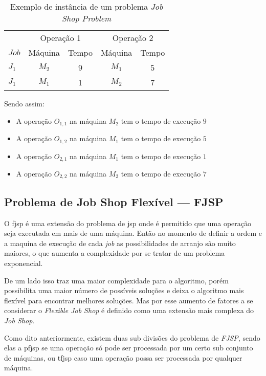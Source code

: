 \begin{table}[htb]
    \centering
    \caption{Exemplo de instância de um problema \textit{Job Shop Problem}}
    \label{fig:ex-instancia-problema-JSP}
    \begin{tabular}[t]{lcccc}
        \hline
        &\multicolumn{2}{c}{Operação 1}&\multicolumn{2}{c}{Operação 2}\\
        $Job$&Máquina&Tempo&Máquina&Tempo\\
        \hline
        $J_1$&$M_2$&9&$M_1$&5\\
        $J_1$&$M_1$&1&$M_2$&7\\
        \hline
    \end{tabular}
\end{table}

\noindent Sendo assim:\hfill
\begin{itemize}
    \item A operação $O_{1,1}$ na máquina $M_2$ tem o tempo de execução $9$
    \item A operação $O_{1,2}$ na máquina $M_1$ tem o tempo de execução $5$
    \item A operação $O_{2,1}$ na máquina $M_1$ tem o tempo de execução $1$
    \item A operação $O_{2,2}$ na máquina $M_2$ tem o tempo de execução $7$
\end{itemize}


\subsection{Problema de Job Shop Flexível — FJSP}
O \gls{fjsp} é uma extensão do problema de \gls{jsp} onde é permitido que uma operação seja executada em mais de uma máquina. Então no momento de definir a ordem e a maquina de execução de cada \textit{job} as possibilidades de arranjo são muito maiores, o que aumenta a complexidade por se tratar de um problema exponencial.


\indent De um lado isso traz uma maior complexidade para o algoritmo, porém possibilita uma maior número de possíveis soluções e deixa o algoritmo mais flexível para encontrar melhores soluções. Mas por esse aumento de fatores a se considerar o \textit{Flexible Job Shop} é definido como uma extensão mais complexa do \textit{Job Shop}.


\indent Como dito anteriormente, existem duas sub divisões do problema de \textit{FJSP}, sendo elas a \gls{pfjsp} se uma operação só pode ser processada por um certo sub conjunto de máquinas, ou \gls{tfjsp} caso uma operação possa ser processada por qualquer máquina.


